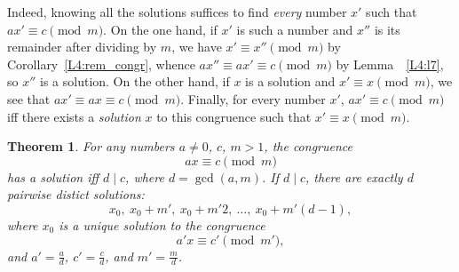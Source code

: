 \documentclass[12pt,notitlepage]{article}
\theoremstyle{plain}
\newtheorem{thm}{Theorem}[section]
\theoremstyle{definition}
\theoremstyle{plain}
\newcommand{\1}{\mathbf{1}}
\newcommand{\0}{\mathbf{0}}
\newcommand{\dvd}{\mathop{\mid}}
\begin{document}
Indeed, knowing all the solutions suffices to find \emph{every} number $x'$ such that $ax' \equiv c \pmod m$. On the one hand, if $x'$ is such a number and $x''$ is its remainder after dividing by $m$, we have $x' \equiv x'' \pmod m$ by Corollary~\ref{L4:rem_congr}, whence $a x'' \equiv ax' \equiv c \pmod m$ by Lemma~~\ref{L4:l7}, so $x''$ is a solution. On the other hand, if $x$ is a solution and $x' \equiv x \pmod m$, we see that $ax' \equiv ax \equiv c \pmod m$. Finally, for every number $x'$, $a x' \equiv c \pmod m$ iff there exists a \emph{solution} $x$ to this congruence such that $x' \equiv x \pmod m$.

\begin{thm}\label{L6:t_cong} For any numbers $a \neq 0$, $c$, $m > 1$, the congruence
\begin{equation}\label{L6:eq1}
a x \equiv c \pmod m
\end{equation}
has a solution iff $d \dvd c$, where $d = \gcd(a, m)$. If $d \dvd c$, there are exactly $d$ pairwise distict solutions:
$$x_0,\ x_0 + m',\ x_0 +m'2,\ \ldots,\ x_0 + m'(d - 1),$$
where $x_0$ is a unique solution to the congruence
\begin{equation}\label{L6:eq2}
a' x \equiv c' \pmod {m'},
\end{equation}
and $a' = \frac{a}{d}$, $c' = \frac{c}{d}$, and  $m' = \frac{m}{d}$.
\end{thm}
\end{document}
